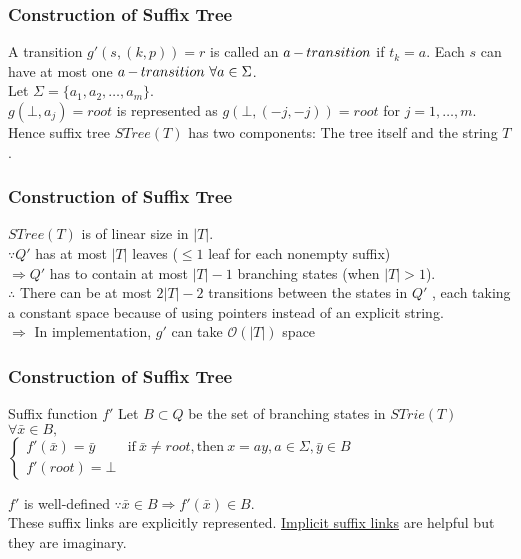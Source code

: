 \documentclass[compress,usenames,dvipsnames]{beamer}
\DeclareMathOperator{\atrans}{\mathnormal{-}}
\newenvironment{definitionblock}[1]{
    \setbeamercolor{block title}{bg=cyan}
    \begin{block}{#1}}{\end{block}
}
\begin{document}
        \begin{frame}\frametitle{Construction of Suffix Tree}
            A transition $g'(s, (k, p)) = r$ is called an \underline{$a\atrans transition$} if $t_k = a$. Each $s$ can have at most one $a\atrans transition \ \forall a \in \Sigma$. \\
            \hfill \break
            Let $\Sigma = \{a_1, a_2, \ldots, a_m \}$. \\
            $g(\bot, a_j) = root$ is represented as $g(\bot, (-j, -j)) = root $ for $ j = 1, \ldots, m$.\\
            \hfill \break
            Hence suffix tree $STree(T)$ has two components: The tree itself and the string $T$.
        \end{frame}

        \begin{frame}\frametitle{Construction of Suffix Tree}
            $STree(T)$ is of linear size in $|T|$. \\
            $\because Q'$ has at most $|T|$ leaves ($\leq 1$ leaf for each nonempty suffix) \\
            $\Rightarrow Q'$ has to contain at most $|T| - 1$ branching states (when $|T| > 1$). \\
            \hfill \break
            $\therefore$ There can be at most $2|T| - 2$ transitions between the states in $Q'$ , each taking a constant space because of using pointers instead of an explicit string. \\
            {\color{red}$\Rightarrow$ In implementation, $g'$ can take $\mathcal{O}(|T|)$ space}
        \end{frame}

        \begin{frame}\frametitle{Construction of Suffix Tree}
            \begin{definitionblock}{Suffix function $f'$}
                Let $B \subset Q$ be the set of branching states in $STrie(T)$ \\
                \hfill \break
                $\forall \bar{x} \in B,$ \\
                $\begin{cases} f'(\bar{x}) = \bar{y} & \mbox{if} \ \bar{x} \neq root, \mbox{then}\ x = ay, a \in \Sigma, \bar{y} \in B \\
                    f'(root) = \bot
                \end{cases}$
                \end{definitionblock}
                $f'$ is well-defined $\because \bar{x} \in B \Rightarrow f'(\bar{x}) \in B$. \\
                These suffix links are explicitly represented. \underline{Implicit suffix links} are helpful but they are imaginary.
            \end{frame}
\end{document}
